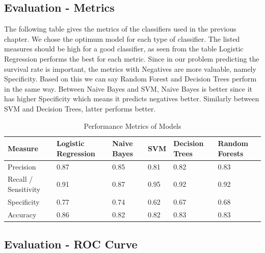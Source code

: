 \documentclass[a4paper,10pt]{report}\usepackage[]{graphicx}\usepackage[]{color}
\begin{document}
\subsection{Evaluation - Metrics}
The following table gives the metrics of the classifiers used in the previous chapter. We chose the optimum model for each type of classifier. The listed measures should be high for a good classifier, as seen from the table Logistic Regression performs the best for each metric. Since in our problem predicting the survival rate is important, the metrics with Negatives are more valuable, namely Specificity. Based on this we can say Random Forest and Decision Trees  perform in the same way. Between Naive Bayes and SVM, Naive Bayes is better since it has higher Specificity which means it predicts negatives better. Similarly between SVM and Decision Trees, latter performs better.
\begin{table}[h]
    \begin{tabular}{llllll}
    Measure              & Logistic Regression & Naive Bayes & SVM  & Decision Trees & Random Forests \\ \hline
    Precision            & 0.87                & 0.85        & 0.81 & 0.82           & 0.83           \\
    Recall / Sensitivity & 0.91                & 0.87        & 0.95 & 0.92           & 0.92           \\
    Specificity          & 0.77                & 0.74        & 0.62 & 0.67           & 0.68           \\
    Accuracy             & 0.86                & 0.82        & 0.82 & 0.83           & 0.83           \\
    \end{tabular}
    \caption{Performance Metrics of Models}
\end{table}

\subsection{Evaluation - ROC Curve}
\end{document}
